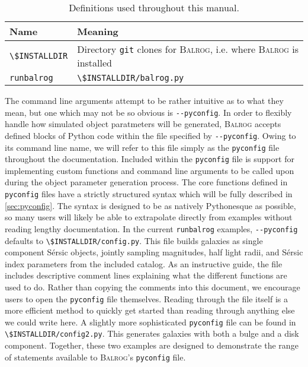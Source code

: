 \documentclass[11pt]{book}
\newcommand{\codett}[1]{\lstinline{#1}}
\newcommand{\py}{Python}
\newcommand{\pyconfig}{\codett{pyconfig}}
\newcommand{\balrog}{\textsc{Balrog}}
\newcommand{\opt}[1]{\codett{--#1}}
\newcommand{\sersic}{S\'{e}rsic}
\begin{document}
\begin{table}
\caption{Definitions used throughout this manual.}
\label{tab:def}
\begin{tabular}{l l}
\toprule %
\textbf{Name} & \textbf{Meaning} \\ \midrule
\codett{\$INSTALLDIR} & Directory \codett{git} clones for \balrog{}, i.e. where \balrog{} is installed \\
\codett{runbalrog} & \codett{\$INSTALLDIR/balrog.py} \\ \bottomrule %
\end{tabular}
\end{table}

The command line arguments attempt to be rather intuitive as to what they mean,
but one which may not be so obvious is \opt{pyconfig}.
In order to flexibly handle how simulated object paratmeters will be generated, \balrog{} accepts defined blocks of \py{} code
within the file specified by \opt{pyconfig}.
Owing to its command line name, we will refer to this file simply as the \pyconfig{} file
throughout the documentation.
Included within the \pyconfig{} file is support for implementing custom functions 
and command line arguments to be called upon during the object parameter generation process.
The core functions defined in \pyconfig{} files have a strictly
structured syntax which will be fully described in \autoref{sec:pyconfig}. 
The syntax is designed to be as natively \py{}esque as possible, so
many users will likely be able to extrapolate directly from examples without reading lengthy documentation. 
In the current \codett{runbalrog} examples, \opt{pyconfig} defaults to \codett{\$INSTALLDIR/config.py}.
This file builds galaxies as single component \sersic{} objects, 
jointly sampling magnitudes, half light radii, and \sersic{} index parameters from the included catalog.
As an instructive guide, the file includes descriptive comment lines explaining what the different functions are used to do.
Rather than copying the comments into this document, we encourage users to open the \pyconfig{} file themselves.
Reading through the file itself is a more efficient method to quickly get started than
reading through anything else we could write here.
A slightly more sophisticated \pyconfig{} file can be found in \codett{\$INSTALLDIR/config2.py}.
This generates galaxies with both a bulge and a disk component.
Together, these two examples are designed to demonstrate the range of statements available to 
\balrog{}'s \pyconfig{} file.
\end{document}
